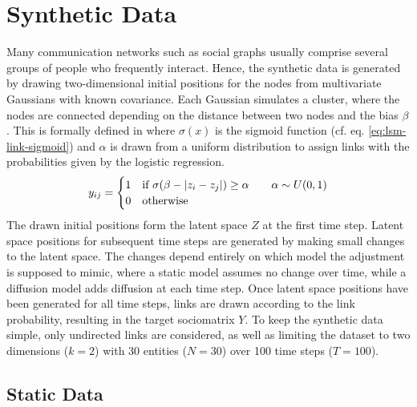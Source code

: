 \section{Synthetic Data}

Many communication networks such as social graphs usually comprise several groups of people who frequently interact. Hence, the synthetic data is generated by drawing two-dimensional initial positions for the nodes from multivariate Gaussians with known covariance. 
Each Gaussian simulates a cluster, where the nodes are connected depending on the distance between two nodes and the bias $\beta$. This is formally defined in  where $\sigma(x)$ is the sigmoid function (cf. eq. \ref{eq:lsm-link-sigmoid}) and $\alpha$ is drawn from a uniform distribution to assign links with the probabilities given by the logistic regression.
\begin{equation}\label{eq:synth-link}
    \sub(y) = 
    \begin{cases}
        1 & \text{if } \sigma(\beta - |z_i - z_j|) \geq \alpha \qquad \alpha\sim U(0,1) \\
        0 & \text{otherwise}
    \end{cases}
\end{equation}
The drawn initial positions form the latent space $Z$ at the first time step. Latent space positions for subsequent time steps are generated by making small changes to the latent space. The changes depend entirely on which model the adjustment is supposed to mimic, where a static model assumes no change over time, while a diffusion model adds diffusion at each time step. Once latent space positions have been generated for all time steps, links are drawn according to the link probability, resulting in the target sociomatrix $Y$. To keep the synthetic data simple, only undirected links are considered, as well as limiting the dataset to two dimensions ($k=2$) with 30 entities ($N=30$) over 100 time steps ($T=100$).

\subsection{Static Data}

